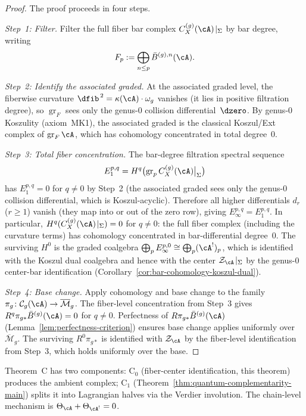 \begin{proof}
The proof proceeds in four steps.

\emph{Step~1: Filter.}
Filter the full fiber bar complex
$C^{(g)}_X(\cA)\!\mid_\Sigma$ by bar degree, writing
\[
F_p := \bigoplus_{n \leq p} \bar{B}^{(g),n}(\cA).
\]

\emph{Step~2: Identify the associated graded.}
At the associated graded level, the fiberwise curvature
$\dfib^{\,2} = \kappa(\cA)\cdot\omega_g$ vanishes (it lies
in positive filtration degree), so $\operatorname{gr}_F$ sees
only the genus-$0$ collision differential~$\dzero$.
By genus-$0$ Koszulity (axiom~MK1), the associated graded is
the classical Koszul/Ext complex of
$\operatorname{gr}_F \cA$, which has cohomology concentrated
in total degree~$0$.

\emph{Step~3: Total fiber concentration.}\quad
The bar-degree filtration spectral sequence
\[
E_1^{p,q} = H^q\bigl(\operatorname{gr}_p
C^{(g)}_X(\cA)\big|_\Sigma\bigr)
\]
has $E_1^{p,q} = 0$ for $q \neq 0$ by Step~2
(the associated graded sees only the
genus-$0$ collision differential, which is Koszul-acyclic).
Therefore all higher differentials $d_r$ ($r \geq 1$) vanish
(they map into or out of the zero row), giving
$E_\infty^{p,q} = E_1^{p,q}$.  In particular,
$H^q(C^{(g)}_X(\cA)\!\mid_\Sigma) = 0$ for $q \neq 0$:
the full fiber complex (including the curvature terms) has
cohomology concentrated in bar-differential degree~$0$.
The surviving $H^0$ is the graded coalgebra
$\bigoplus_p E_\infty^{p,0} \cong \bigoplus_p (\cA^!)_p$,
which is identified with the Koszul dual coalgebra and
hence with the center $\mathcal{Z}_{\cA}\!\mid_\Sigma$
by the genus-$0$ center-bar identification
(Corollary~\ref{cor:bar-cohomology-koszul-dual}).

\emph{Step~4: Base change.}
Apply cohomology and base change to the family
$\pi_g\colon \mathcal{C}_g(\cA) \to \overline{\mathcal{M}}_g$.
The fiber-level concentration from Step~3 gives
$R^q\pi_{g*}\bar{B}^{(g)}(\cA) = 0$ for $q \neq 0$.
Perfectness of $R\pi_{g*}\bar{B}^{(g)}(\cA)$
(Lemma~\ref{lem:perfectness-criterion}) ensures base change applies
uniformly over $\overline{\mathcal{M}}_g$.
The surviving $R^0\pi_{g*}$ is identified with
$\mathcal{Z}_{\cA}$ by the fiber-level identification
from Step~3, which holds uniformly over the base.
\end{proof}

\begin{remark}\label{rem:theorem-C-decomposition}
Theorem~C has two components: $\mathrm{C}_0$ (fiber-center
identification, this theorem) produces the ambient complex;
$\mathrm{C}_1$ (Theorem~\ref{thm:quantum-complementarity-main})
splits it into Lagrangian halves via the Verdier involution.
The chain-level mechanism is
$\Theta_\cA+\Theta_{\cA^!}=0$.
\end{remark}

